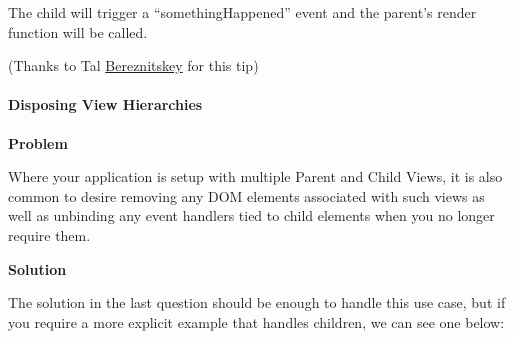 \documentclass[9pt]{book}
\begin{document}
The child will trigger a ``somethingHappened'' event and the parent's
render function will be called.

(Thanks to Tal
\href{http://stackoverflow.com/users/269666/tal-bereznitskey}{Bereznitskey}
for this tip)

\paragraph{Disposing View Hierarchies}\label{disposing-view-hierarchies}

\textbf{Problem}

Where your application is setup with multiple Parent and Child Views, it
is also common to desire removing any DOM elements associated with such
views as well as unbinding any event handlers tied to child elements
when you no longer require them.

\textbf{Solution}

The solution in the last question should be enough to handle this use
case, but if you require a more explicit example that handles children,
we can see one below:
\end{document}

